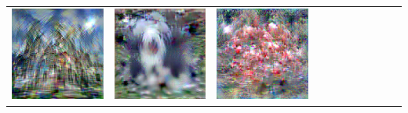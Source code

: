 \documentclass[main.tex]{subfiles}
\begin{document}
{\begin{center}
\begin{tabular}{ccccccccccc}
    \includegraphics[align=c,width=\coverwidth\linewidth]{figures/cover/imagenet/church_0.pdf} &
    \includegraphics[align=c,width=\coverwidth\linewidth]{figures/cover/imagenet/english_sheepdog_0.pdf} &
    \includegraphics[align=c,width=\coverwidth\linewidth]{figures/cover/imagenet/flamingo_0.pdf} &

\end{tabular}
\end{center}}
\end{document}
